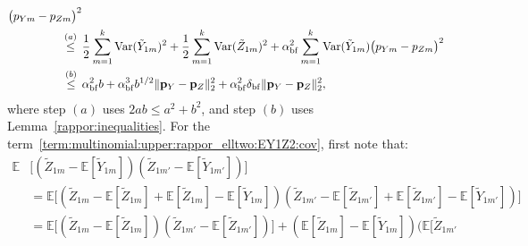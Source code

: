 \documentclass[twoside,11pt]{article}
\newcommand{\rvTwo}{Y}
\newcommand{\rvThree}{Z}
\newcommand{\private}[1]{\tilde{#1}}
\newcommand{\mE}{\mathbb{E}} %
\newcommand{\normSqMultinomMax}{b}
\newcommand{\alphabetSize}{k} %
\newcommand{\vectorIndex}{m}
\newcommand{\probVecElement}[2]{p_{{#1}{#2}}}
\newcommand{\probVec}{\mathbf{p}} %
\newcommand{\privacyParameter}{\alpha} %
\newcommand{\privacyParameterrappor}{\privacyParameter_{\mathrm{bf}}}
\newcommand{\smallNumber}{\delta}
\newcommand{\smallNumberrappor}{\smallNumber_{\mathrm{bf}}}
\begin{document}
\begin{appendix}
\begin{align*}
		\bigl(  \probVecElement{\rvTwo}{\vectorIndex} - \probVecElement{\rvThree}{\vectorIndex}\bigr)^2
		\\ \stackrel{(a)}{\leq} \hskip 1.57mm &
		\frac{1}{2}
		\sum_{\vectorIndex = 1}^\alphabetSize
		\mathrm{Var}(\private{Y}_{1 \vectorIndex})^2
		+
		\frac{1}{2}
		\sum_{\vectorIndex = 1}^\alphabetSize
		\mathrm{Var}(
		\private{\rvThree}_{1 \vectorIndex}
		)^2
		+
		\privacyParameterrappor ^2
		\sum_{\vectorIndex = 1}^\alphabetSize
		\mathrm{Var}(\private{Y}_{1 \vectorIndex})
		\bigl(  \probVecElement{\rvTwo}{\vectorIndex} - \probVecElement{\rvThree}{\vectorIndex}\bigr)^2
		\\ \stackrel{(b)}{\leq} \hskip 1.57mm &
		\privacyParameterrappor^2 \normSqMultinomMax
		+
		\privacyParameterrappor^3
		\normSqMultinomMax^{1/2}
		\|\probVec_{\rvTwo} - \probVec_{\rvThree}\|_2^2
		+
		\privacyParameterrappor^2
		\smallNumberrappor
		\|\probVec_{\rvTwo} - \probVec_{\rvThree}\|_2^2,
	\end{align*}
	where step $(a)$ uses $2ab \leq a^2 + b^2$, and step $(b)$ uses Lemma~\ref{rappor:inequalities}.
	For the term~\eqref{term:multinomial:upper:rappor_elltwo:EY1Z2:cov}, first
	note that:
	\begin{align*}
		\mE&
		\bigl[ %
		(
		\private{\rvThree}_{1 \vectorIndex}
		-
		\mE
		[
		\private{\rvTwo}_{1 \vectorIndex}
		]
		)
		(
		\private{\rvThree}_{1 \vectorIndex'}
		-
		\mE
		[
		\private{\rvTwo}_{1 \vectorIndex'}
		]
		)
		\bigr]
		\\&=
		\mE
		\bigl[ %
		(
		\private{\rvThree}_{1 \vectorIndex}
		-
		\mE
		[
		\private{\rvThree}_{1 \vectorIndex}
		]
		+
		\mE
		[
		\private{\rvThree}_{1 \vectorIndex}
		]
		-
		\mE
		[
		\private{\rvTwo}_{1 \vectorIndex}
		]
		)
		(
		\private{\rvThree}_{1 \vectorIndex'}
		-
		\mE
		[
		\private{\rvThree}_{1 \vectorIndex'}
		]
		+
		\mE
		[
		\private{\rvThree}_{1 \vectorIndex'}
		]
		-
		\mE
		[
		\private{\rvTwo}_{1 \vectorIndex'}
		]
		)
		\bigr]
		\\&=
		\mE
		\bigl[ %
		(
		\private{\rvThree}_{1 \vectorIndex}
		-
		\mE
		[
		\private{\rvThree}_{1 \vectorIndex}
		])
		(
		\private{\rvThree}_{1 \vectorIndex'}
		-
		\mE
		[
		\private{\rvThree}_{1 \vectorIndex'}
		])
		\bigr]
		+
		(
		\mE
		[
		\private{\rvThree}_{1 \vectorIndex}
		]
		-
		\mE
		[
		\private{\rvTwo}_{1 \vectorIndex}
		]
		)
		(
		\mE
		[
		\private{\rvThree}_{1 \vectorIndex'}

\end{align*}
\end{appendix}
\end{document}
